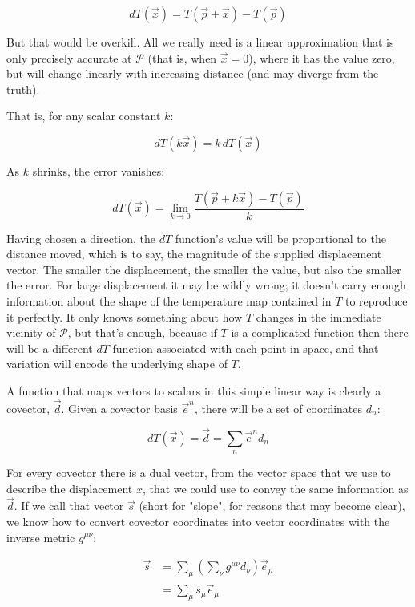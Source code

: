$$
dT(\vec{x}) = T(\vec{p} + \vec{x}) - T(\vec{p})
$$

But that would be overkill. All we really need is a linear approximation that is only precisely accurate at $\mathcal{P}$ (that is, when $\vec{x} = 0$), where it has the value zero, but will change linearly with increasing distance (and may diverge from the truth). 

That is, for any scalar constant $k$:

$$
dT(k \vec{x}) = k \, dT(\vec{x})
$$

As $k$ shrinks, the error vanishes:

\begin{equation}
    dT(\vec{x}) = \lim_{k \to 0} \frac{T(\vec{p} + k\vec{x}) - T(\vec{p})}{k}
    \label{eqn:directional-derivative-limit}
\end{equation}

Having chosen a direction, the $dT$ function's value will be proportional to the distance moved, which is to say, the magnitude of the supplied displacement vector. The smaller the displacement, the smaller the value, but also the smaller the error. For large displacement it may be wildly wrong; it doesn't carry enough information about the shape of the temperature map contained in $T$ to reproduce it perfectly. It only knows something about how $T$ changes in the immediate vicinity of $\mathcal{P}$, but that's enough, because if $T$ is a complicated function then there will be a different $dT$ function associated with each point in space, and that variation will encode the underlying shape of $T$.

A function that maps vectors to scalars in this simple linear way is clearly a covector, $\vec{d}$. Given a covector basis $\vec{e}^n$, there will be a set of coordinates $d_n$:

\begin{equation}
    dT(\vec{x}) = \vec{d} = \sum_n \vec{e}^n d_n
    \label{eqn:covector-directional-derivative}
\end{equation}

For every covector there is a dual vector, from the vector space that we use to describe the displacement $x$, that we could use to convey the same information as $\vec{d}$. If we call that vector $\vec{s}$ (short for "slope", for reasons that may become clear), we know how to convert covector coordinates into vector coordinates with the inverse metric $g^{\mu\nu}$:

\begin{equation}
\begin{split}
\vec{s} 
&= \sum_{\mu} \left( \sum_{\nu} g^{\mu\nu} d_{\nu} \right) \vec{e}_{\mu} \\
&= \sum_{\mu} s_{\mu} \vec{e}_{\mu}
\label{eqn:vector-gradient}
\end{split}
\end{equation}

